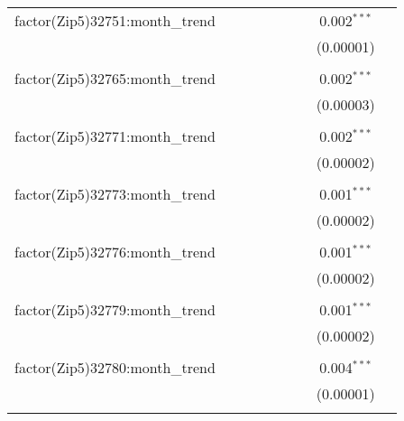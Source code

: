 \begin{table}[H]
{\begin{tabular}{@{\extracolsep{5pt}}lcccccccc}
  factor(Zip5)32751:month\_trend &  &  &  &  &  &  & 0.002$^{***}$ &  \\  

   &  &  &  &  &  &  & (0.00001) &  \\  

   & & & & & & & & \\  

  factor(Zip5)32765:month\_trend &  &  &  &  &  &  & 0.002$^{***}$ &  \\  

   &  &  &  &  &  &  & (0.00003) &  \\  

   & & & & & & & & \\  

  factor(Zip5)32771:month\_trend &  &  &  &  &  &  & 0.002$^{***}$ &  \\  

   &  &  &  &  &  &  & (0.00002) &  \\  

   & & & & & & & & \\  

  factor(Zip5)32773:month\_trend &  &  &  &  &  &  & 0.001$^{***}$ &  \\  

   &  &  &  &  &  &  & (0.00002) &  \\  

   & & & & & & & & \\  

  factor(Zip5)32776:month\_trend &  &  &  &  &  &  & 0.001$^{***}$ &  \\  

   &  &  &  &  &  &  & (0.00002) &  \\  

   & & & & & & & & \\  

  factor(Zip5)32779:month\_trend &  &  &  &  &  &  & 0.001$^{***}$ &  \\  

   &  &  &  &  &  &  & (0.00002) &  \\  

   & & & & & & & & \\  

  factor(Zip5)32780:month\_trend &  &  &  &  &  &  & 0.004$^{***}$ &  \\  

   &  &  &  &  &  &  & (0.00001) &  \\  

   & & & & & & & & \\  


\end{tabular}}
\end{table}
